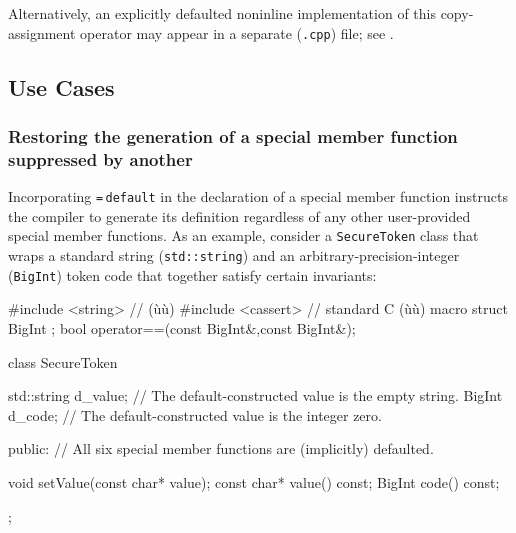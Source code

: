 \noindent Alternatively, an explicitly defaulted noninline implementation of this
copy-assignment operator may appear in a separate (\lstinline!.cpp!) file;
see .

\subsection[Use Cases]{Use Cases}\label{default-use-cases}

\subsubsection[Restoring the generation of a special member function suppressed by another]{Restoring the generation of a special member function suppressed by another}\label{restoring-the-generation-of-a-special-member-function-suppressed-by-another}

Incorporating \lstinline!=!\,\lstinline!default! in the declaration of a
special member function instructs the compiler to generate its
definition regardless of any other user-provided special member
functions. As an example, consider a 
\lstinline!SecureToken! class that wraps a standard string
(\lstinline!std::string!) and an arbitrary-precision-integer
(\lstinline!BigInt!) token code that together satisfy certain invariants:

\begin{emcppshiddenlisting}[emcppsbatch={e1,e2,e3}]
#include <string>   // (ù{}ù)
#include <cassert>  // standard C (ù{}ù) macro
struct BigInt {};
bool operator==(const BigInt&,const BigInt&);
\end{emcppshiddenlisting}
\begin{emcppslisting}[emcppsbatch=e1]
class SecureToken
{
    std::string d_value;  // The default-constructed value is the empty string.
    BigInt      d_code;   // The default-constructed value is the integer zero.

public:
    // All six special member functions are (implicitly) defaulted.

    void setValue(const char* value);
    const char* value() const;
    BigInt code() const;
};
\end{emcppslisting}

